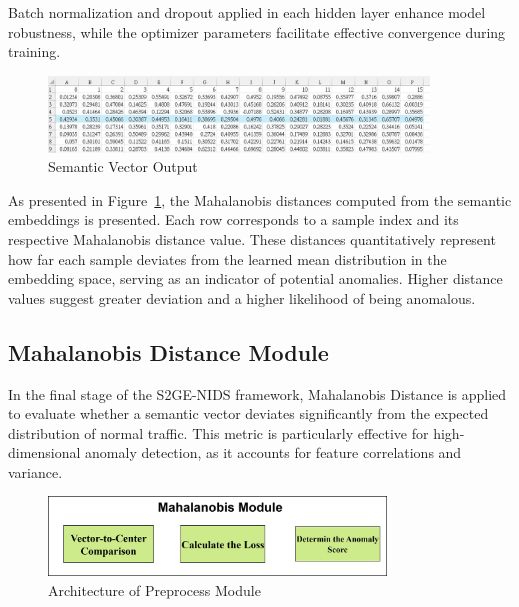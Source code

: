 \begin{ZhChapter}
    Batch normalization and dropout applied in each hidden layer enhance model robustness, while the optimizer parameters facilitate effective convergence during training.

    \begin{figure}[htbp]
        \centering
        \includegraphics[width = 0.9\textwidth]{image/mlp_result.jpg}
        \caption{Semantic Vector Output}
        \label{fig:MLP_rs}
    \end{figure}
    As presented in Figure~\ref{fig:MLP_rs}, the Mahalanobis distances computed from the semantic embeddings is presented. Each row corresponds to a sample index and its respective Mahalanobis distance value. These distances quantitatively represent how far each sample deviates from the learned mean distribution in the embedding space, serving as an indicator of potential anomalies. Higher distance values suggest greater deviation and a higher likelihood of being anomalous.

    \subsection{Mahalanobis Distance Module}%
    In the final stage of the S2GE-NIDS framework, Mahalanobis Distance is applied to evaluate whether a semantic vector deviates significantly from the expected distribution of normal traffic. This metric is particularly effective for high-dimensional anomaly detection, as it accounts for feature correlations and variance.

    \begin{figure}[htbp]
        \centering
        \includegraphics[width = 0.8\textwidth]{image/MahalanobisModule.jpg}
        \caption{Architecture of Preprocess Module }
        \label{fig:MahalanobisModule}
    \end{figure}



\end{ZhChapter}
